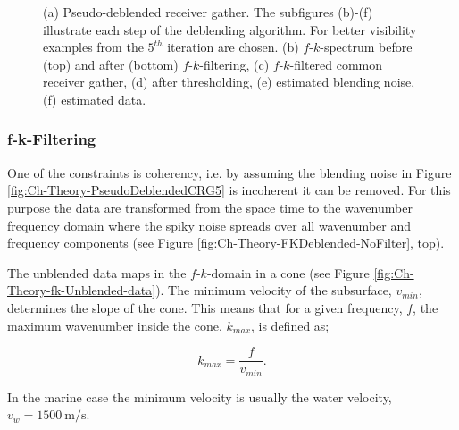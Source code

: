\begin{figure}
\begin{subfigure}[t]{0.25\textwidth}
		\caption{}
		\label{fig:Ch-Theory-Deblended}
	\end{subfigure}
	\caption{(a) Pseudo-deblended receiver gather. The subfigures (b)-(f) illustrate each step of the deblending algorithm. For better visibility examples from the $5^{th}$ iteration are chosen. (b) $f$-$k$-spectrum before (top) and after (bottom) $f$-$k$-filtering, (c) $f$-$k$-filtered common receiver gather, (d) after thresholding, (e) estimated blending noise, (f) estimated data.}
	\label{fig:Ch-Theory-IterativeDeblending}
\end{figure}


\subsubsection*{f-k-Filtering}

One of the constraints is coherency, i.e. by assuming the blending noise in Figure \ref{fig:Ch-Theory-PseudoDeblendedCRG5} is incoherent it can be removed. For this purpose the data are transformed from the space time to the wavenumber frequency domain where the spiky noise spreads over all wavenumber and frequency components (see Figure \ref{fig:Ch-Theory-FKDeblended-NoFilter}, top). 


The unblended data maps in the $f$-$k$-domain in a cone (see Figure \ref{fig:Ch-Theory-fk-Unblended-data}). The minimum velocity of the subsurface, $v_{min}$, determines the slope of the cone. This means that for a given frequency, $f$, the maximum wavenumber inside the cone, $k_{max}$, is defined as; 

\begin{equation}
	k_{max} = \frac{f}{v_{min}}.
	\label{eq_Ch-Theory-MaxWavenmber}
\end{equation} 

In the marine case the minimum velocity is usually the water velocity, $v_{w} = \SI{1500}{\metre\per\second}$.

